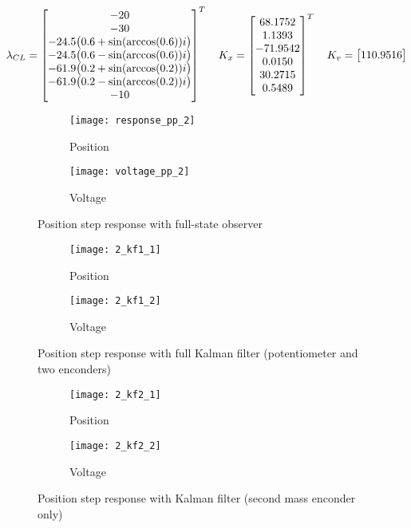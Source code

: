 \begin{equation}
	\lambda_{CL} =
	\begin{bmatrix}
		-20 \\ -30 \\ -24.5 \bigl{(} 0.6+\sin(\arccos(0.6))i \bigr{)} \\ -24.5 \bigl{(} 0.6-\sin(\arccos(0.6))i \bigr{)} \\
		-61.9 \bigl{(} 0.2+\sin(\arccos(0.2))i \bigr{)} \\ -61.9 \bigl{(} 0.2-\sin(\arccos(0.2))i \bigr{)} \\ -10
	\end{bmatrix}^{T}
	\quad
	K_x =
	\begin{bmatrix}
		68.1752  \\  1.1393 \\ -71.9542 \\   0.0150 \\  30.2715  \\  0.5489
	\end{bmatrix}^{T}
	\quad
	K_v =
	\begin{bmatrix}
		110.9516
	\end{bmatrix}
\end{equation}

\begin{figure*}[h]
	\centering
	\begin{subfigure}{0.5\columnwidth}
		\texttt{[image: response\_pp\_2]}
		\caption{Position}
	\end{subfigure}
	\begin{subfigure}{0.45\columnwidth}
		\texttt{[image: voltage\_pp\_2]}
		\caption{Voltage}
	\end{subfigure}
	\caption{Position step response with full-state observer}
\end{figure*}

\begin{figure*}[h]
	\centering
	\begin{subfigure}{0.5\columnwidth}
		\texttt{[image: 2\_kf1\_1]}
		\caption{Position}
	\end{subfigure}
	\begin{subfigure}{0.45\columnwidth}
		\texttt{[image: 2\_kf1\_2]}
		\caption{Voltage}
	\end{subfigure}
	\caption{Position step response with full Kalman filter (potentiometer and two enconders)}
\end{figure*}

\begin{figure*}[h]
	\centering
	\begin{subfigure}{0.5\columnwidth}
		\texttt{[image: 2\_kf2\_1]}
		\caption{Position}
	\end{subfigure}
	\begin{subfigure}{0.45\columnwidth}
		\texttt{[image: 2\_kf2\_2]}
		\caption{Voltage}
	\end{subfigure}
	\caption{Position step response with Kalman filter (second mass enconder only)}
\end{figure*}
